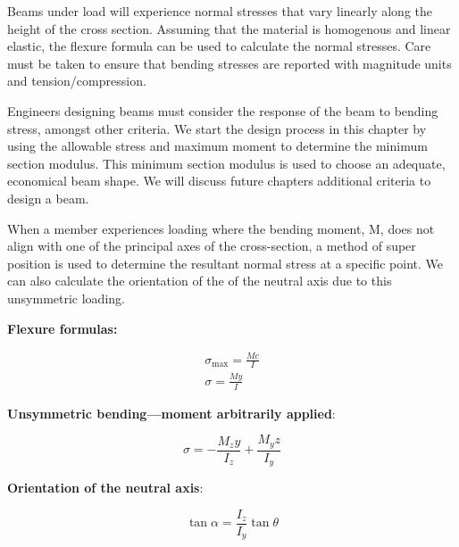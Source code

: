 \documentclass[
  letterpaper,
  DIV=11,
  numbers=noendperiod]{scrreprt}
\begin{document}
\begin{tcolorbox}[enhanced jigsaw, breakable, opacityback=0, toptitle=1mm, left=2mm, colback=white, opacitybacktitle=0.6, colframe=quarto-callout-note-color-frame, titlerule=0mm, arc=.35mm, leftrule=.75mm, bottomtitle=1mm, colbacktitle=quarto-callout-note-color!10!white, rightrule=.15mm, title={Key takeaways}, bottomrule=.15mm, toprule=.15mm, coltitle=black]

Beams under load will experience normal stresses that vary linearly
along the height of the cross section. Assuming that the material is
homogenous and linear elastic, the flexure formula can be used to
calculate the normal stresses. Care must be taken to ensure that bending
stresses are reported with magnitude units and tension/compression.

Engineers designing beams must consider the response of the beam to
bending stress, amongst other criteria. We start the design process in
this chapter by using the allowable stress and maximum moment to
determine the minimum section modulus. This minimum section modulus is
used to choose an adequate, economical beam shape. We will discuss
future chapters additional criteria to design a beam.

When a member experiences loading where the bending moment, M, does not
align with one of the principal axes of the cross-section, a method of
super position is used to determine the resultant normal stress at a
specific point. We can also calculate the orientation of the of the
neutral axis due to this unsymmetric loading.

\end{tcolorbox}

\begin{tcolorbox}[enhanced jigsaw, breakable, opacityback=0, toptitle=1mm, left=2mm, colback=white, opacitybacktitle=0.6, colframe=quarto-callout-note-color-frame, titlerule=0mm, arc=.35mm, leftrule=.75mm, bottomtitle=1mm, colbacktitle=quarto-callout-note-color!10!white, rightrule=.15mm, title={Key equations}, bottomrule=.15mm, toprule=.15mm, coltitle=black]

\textbf{Flexure formulas:}\,

\[
\begin{gathered}
\sigma_{\max }=\frac{M c}{I} \\
\sigma=\frac{M y}{I}
\end{gathered}
\]

\textbf{Unsymmetric bending---moment arbitrarily applied}:

\[
\sigma=-\frac{M_z y}{I_z}+\frac{M_y z}{I_y}
\]

\textbf{Orientation of the neutral axis}:

\[
\tan \alpha=\frac{I_z}{I_y} \tan \theta
\]

\end{tcolorbox}
\end{document}
